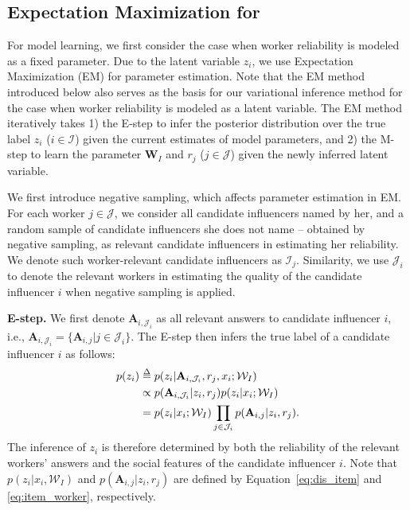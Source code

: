 \subsection{Expectation Maximization for \sys} 
\label{sec:em}
For model learning, we first consider the case when worker reliability is modeled as a fixed parameter. Due to the latent variable $z_i$, we use Expectation Maximization (EM) \cite{dempster1977maximum} for parameter estimation. Note that the EM method introduced below also serves as the basis for our variational inference method for the case when worker reliability is modeled as a latent variable. The EM method iteratively takes 1) the E-step to infer the posterior distribution over the true label $z_i$ ($i\in \mathcal{I}$) given the current estimates of model parameters, and 2) the M-step to learn the parameter $\mathbf{W}_I$ and $r_j$ ($j\in \mathcal{J}$) given the newly inferred latent variable.

We first introduce negative sampling, which affects parameter estimation in EM. For each worker $j\in \mathcal{J}$, we consider all candidate influencers named by her, and a random sample of candidate influencers she does not name -- obtained by negative sampling, as relevant candidate influencers in estimating her reliability. We denote such worker-relevant candidate influencers as $\mathcal{I}_j$. Similarity, we use $\mathcal{J}_i$ to denote the relevant workers in estimating the quality of the candidate influencer $i$ when negative sampling is applied.

\smallskip
\noindent\textbf{E-step.} We first denote $\mathbf{A}_{i,\mathcal{J}_i}$ as all relevant answers to candidate influencer $i$, i.e., $\mathbf{A}_{i,\mathcal{J}_i} = \{\mathbf{A}_{i,j}|j \in \mathcal{J}_i\}$. The E-step then infers the true label of a candidate influencer $i$ as follows:
%
\begin{align}
    p(z_i) & \delequal p(z_i|\mathbf{A}_{i,\mathcal{J}_i},r_{j},x_i;\mathcal{W}_I) \nonumber\\
        &\propto p(\mathbf{A}_{i,\mathcal{J}_i}|z_i,r_j) p(z_i|x_i;\mathcal{W}_I) \label{eq:dist_cond}\\
        &=p(z_i|x_i;\mathcal{W}_I) \prod_{j \in \mathcal{J}_i} p(\mathbf{A}_{i,j}|z_i,r_{j}). \nonumber    
\end{align}
%
The inference of $z_i$ is therefore determined by both the reliability of the relevant workers' answers and the social features of the candidate influencer $i$. Note that $p(z_i|x_i,\mathcal{W}_I)$ and $p(\mathbf{A}_{i,j}|z_i,r_{j})$ are defined by Equation~\ref{eq:dis_item} and \ref{eq:item_worker}, respectively.

